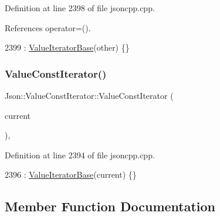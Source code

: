 Definition at line 2398 of file jsoncpp.\+cpp.



References operator=().


\begin{DoxyCode}
2399     : \hyperlink{class_json_1_1_value_iterator_base_af45b028d9ff9cbd2554a87878b42dd75}{ValueIteratorBase}(other) \{\}
\end{DoxyCode}
\mbox{\label{class_json_1_1_value_const_iterator_aa0a87edf5f1097f91dca5f2a389c4abd}} 
\subsubsection{\texorpdfstring{Value\+Const\+Iterator()}{ValueConstIterator()}\hspace{0.1cm}{\footnotesize\ttfamily [3/3]}}
{\footnotesize\ttfamily Json\+::\+Value\+Const\+Iterator\+::\+Value\+Const\+Iterator (\begin{DoxyParamCaption}\item[{const Value\+::\+Object\+Values\+::iterator \&}]{current }\end{DoxyParamCaption})\hspace{0.3cm}{\ttfamily [explicit]}, {\ttfamily [private]}}



Definition at line 2394 of file jsoncpp.\+cpp.


\begin{DoxyCode}
2396     : \hyperlink{class_json_1_1_value_iterator_base_af45b028d9ff9cbd2554a87878b42dd75}{ValueIteratorBase}(current) \{\}
\end{DoxyCode}


\subsection{Member Function Documentation}
\mbox{\label{class_json_1_1_value_const_iterator_ae5612dad47a6387eef71d584fb741d0c}} 
